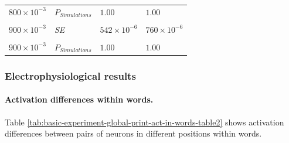 \documentclass[
]{article}
\begin{document}
\begin{longtable}[t]{llll}
${800}\times 10^{-3}$ & $P_{Simulations}$ & $1.00$ & $1.00$\\
\cellcolor{gray!6}{${900}\times 10^{-3}$} & \cellcolor{gray!6}{{\em M}} & \cellcolor{gray!6}{${5.39}\times 10^{-3}$} & \cellcolor{gray!6}{${7.56}\times 10^{-3}$}\\
${900}\times 10^{-3}$ & {\em SE} & ${542}\times 10^{-6}$ & ${760}\times 10^{-6}$\\
\cellcolor{gray!6}{${900}\times 10^{-3}$} & \cellcolor{gray!6}{$p_{Wilcoxon}$} & \cellcolor{gray!6}{${3.96}\times 10^{-18}$} & \cellcolor{gray!6}{${3.96}\times 10^{-18}$}\\
\addlinespace
${900}\times 10^{-3}$ & $P_{Simulations}$ & $1.00$ & $1.00$\\*
\end{longtable}

\clearpage

\hypertarget{electrophysiological-results-1}{%
\subsubsection{Electrophysiological
results}\label{electrophysiological-results-1}}

\hypertarget{activation-differences-within-words.}{%
\paragraph{Activation differences within
words.}\label{activation-differences-within-words.}}

Table \ref{tab:basic-experiment-global-print-act-in-words-table2} shows
activation differences between pairs of neurons in different positions
within words.
\end{document}
